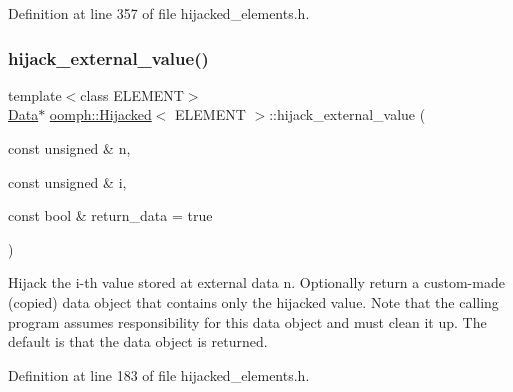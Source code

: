 Definition at line 357 of file hijacked\+\_\+elements.\+h.

\mbox{\label{classoomph_1_1Hijacked_a9e11fa249f667b130e93af9379322182}} 
\subsubsection{\texorpdfstring{hijack\+\_\+external\+\_\+value()}{hijack\_external\_value()}}
{\footnotesize\ttfamily template$<$class E\+L\+E\+M\+E\+NT$>$ \\
\hyperlink{classoomph_1_1Data}{Data}$\ast$ \hyperlink{classoomph_1_1Hijacked}{oomph\+::\+Hijacked}$<$ E\+L\+E\+M\+E\+NT $>$\+::hijack\+\_\+external\+\_\+value (\begin{DoxyParamCaption}\item[{const unsigned \&}]{n,  }\item[{const unsigned \&}]{i,  }\item[{const bool \&}]{return\+\_\+data = {\ttfamily true} }\end{DoxyParamCaption})\hspace{0.3cm}{\ttfamily [inline]}}



Hijack the i-\/th value stored at external data n. Optionally return a custom-\/made (copied) data object that contains only the hijacked value. Note that the calling program assumes responsibility for this data object and must clean it up. The default is that the data object is returned. 



Definition at line 183 of file hijacked\+\_\+elements.\+h.

\mbox{\label{classoomph_1_1Hijacked_a835ce930b91c2c138f3b4de12aeba216}} 
